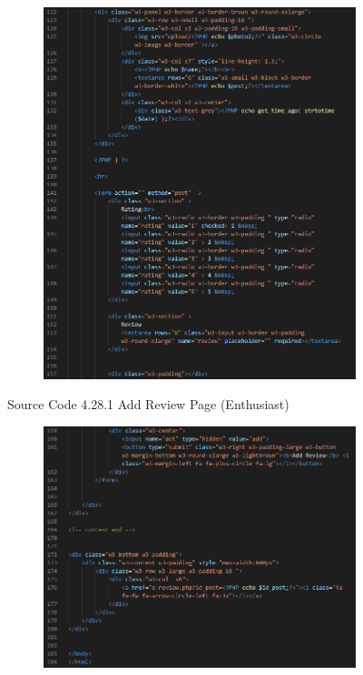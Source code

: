 \begin{enumerate}[1.]
\begin{figure}[h]
        \begin{subfigure}[b]{0.6\textwidth}
            \centering
            \includegraphics[width=\textwidth]{mainmatter/images/frontend/code/eaddreview2.png}
            \label{fig:sub2}
        \end{subfigure}
        \caption*{Source Code 4.28.1 Add Review Page (Enthusiast)}
        \label{fig:myfig67a}
    \end{figure}
    \begin{figure}[h]\ContinuedFloat
        \centering
        \begin{subfigure}[b]{0.7\textwidth}
            \centering
            \includegraphics[width=\textwidth]{mainmatter/images/frontend/code/eaddreview3.png}

\end{subfigure}
\end{figure}
\end{enumerate}
